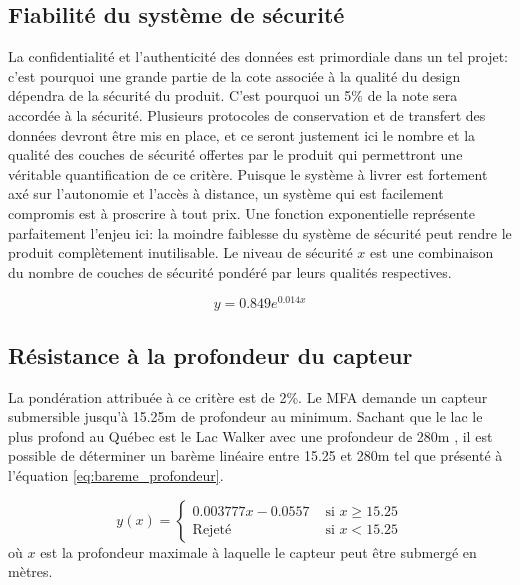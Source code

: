 \subsection{Fiabilité du système de sécurité}


La confidentialité et l'authenticité des données est primordiale dans un tel projet: c'est pourquoi une grande partie de la cote associée à la qualité du design dépendra de la sécurité du produit. C'est pourquoi un 5\% de la note sera accordée à la sécurité. Plusieurs protocoles de conservation et de transfert des données devront être mis en place, et ce seront justement ici le nombre et la qualité des couches de sécurité offertes par le produit qui permettront une véritable quantification de ce critère. Puisque le système à livrer est fortement axé sur l'autonomie et l'accès à distance, un système qui est facilement compromis est à proscrire à tout prix. Une fonction exponentielle représente parfaitement l'enjeu ici: la moindre faiblesse du système de sécurité peut rendre le produit complètement inutilisable. Le niveau de sécurité $x$ est une combinaison du nombre de couches de sécurité pondéré par leurs qualités respectives.

\begin{equation}
    y = 0.849 e^{0.014x}
    \label{eq:bareme_sécurité}
\end{equation}

\subsection{Résistance à la profondeur du capteur}

La pondération attribuée à ce critère est de 2\%. Le MFA demande un capteur submersible jusqu'à 15.25m de profondeur au minimum. Sachant que le lac le plus profond au Québec est le Lac Walker avec une profondeur de 280m \cite{Lac_walker}, il est possible de déterminer un barème linéaire entre 15.25 et 280m tel que présenté à l'équation \ref{eq:bareme_profondeur}.

\begin{equation}
y(x) = \begin{cases}
        0.003777x-0.0557 & \text{ si } x \geq 15.25\\
        \text{Rejeté} & \text{ si } x < 15.25
    \end{cases}
    \label{eq:bareme_profondeur}
\end{equation}
où $x$ est la profondeur maximale à laquelle le capteur peut être submergé en mètres.

